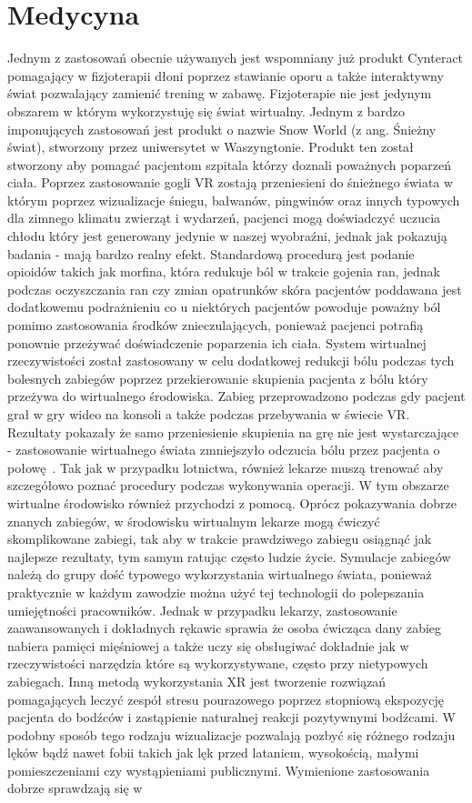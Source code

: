 \section{Medycyna}
\label{sec:medycyna}
 Jednym z zastosowań obecnie używanych jest wspomniany już produkt Cynteract pomagający w fizjoterapii dłoni poprzez stawianie oporu a także interaktywny świat pozwalający zamienić trening w zabawę. Fizjoterapie nie jest jedynym obszarem w którym wykorzystuję się świat wirtualny. Jednym z bardzo imponujących zastosowań jest produkt o nazwie Snow World (z ang. Śnieżny świat), stworzony przez uniwersytet w Waszyngtonie. Produkt ten został stworzony aby pomagać pacjentom szpitala którzy doznali poważnych poparzeń ciała. Poprzez zastosowanie gogli VR zostają przeniesieni do śnieżnego świata w którym poprzez wizualizacje śniegu, bałwanów, pingwinów oraz innych typowych dla zimnego klimatu zwierząt i wydarzeń, pacjenci  mogą doświadczyć uczucia chłodu który jest generowany jedynie w naszej wyobraźni, jednak jak pokazują badania - mają bardzo realny efekt. Standardową procedurą jest podanie opioidów takich jak morfina, która redukuje ból w trakcie gojenia ran, jednak podczas oczyszczania ran czy zmian opatrunków skóra pacjentów poddawana jest dodatkowemu podrażnieniu co u niektórych pacjentów powoduje poważny ból pomimo zastosowania środków znieczulających, ponieważ pacjenci potrafią ponownie przeżywać doświadczenie poparzenia ich ciała. System wirtualnej rzeczywistości został zastosowany w celu dodatkowej redukcji bólu podczas tych bolesnych zabiegów poprzez przekierowanie skupienia pacjenta z bólu który przeżywa do wirtualnego środowiska. Zabieg przeprowadzono podczas  gdy pacjent grał w gry wideo na konsoli a także podczas przebywania w świecie VR. Rezultaty pokazały że samo przeniesienie skupienia na grę nie jest wystarczające - zastosowanie wirtualnego świata zmniejszyło odczucia bólu przez pacjenta o połowę~\cite{snow}. Tak jak w przypadku lotnictwa, również lekarze muszą trenować aby szczegółowo poznać procedury podczas wykonywania operacji. W tym obszarze wirtualne środowisko również przychodzi z pomocą. Oprócz pokazywania dobrze znanych zabiegów, w środowisku wirtualnym lekarze mogą ćwiczyć skomplikowane zabiegi, tak aby w trakcie prawdziwego zabiegu osiągnąć jak najlepsze rezultaty, tym samym ratując często ludzie życie. Symulacje zabiegów należą do grupy dość typowego wykorzystania wirtualnego świata, ponieważ praktycznie w każdym zawodzie można użyć tej technologii do polepszania umiejętności pracowników. Jednak w przypadku lekarzy, zastosowanie zaawansowanych i dokładnych rękawic sprawia że osoba ćwicząca dany zabieg nabiera pamięci mięśniowej a także uczy się obsługiwać dokładnie jak w rzeczywistości narzędzia które są wykorzystywane, często przy nietypowych zabiegach. Inną metodą wykorzystania XR jest tworzenie rozwiązań pomagających leczyć zespół stresu pourazowego poprzez stopniową ekspozycję pacjenta do bodźców i zastąpienie naturalnej reakcji pozytywnymi bodźcami. W podobny sposób tego rodzaju wizualizacje pozwalają pozbyć się różnego rodzaju lęków bądź nawet fobii takich jak lęk przed lataniem, wysokością, małymi pomieszczeniami czy wystąpieniami publicznymi. Wymienione zastosowania dobrze sprawdzają się w 
